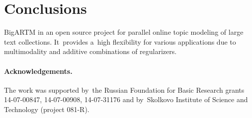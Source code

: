 \documentclass[russian,english]{llncs}
\begin{document}
\section{Conclusions}
\label{sec:Conclusions}

\mbox{BigARTM} in an open source project for parallel online topic modeling of large text collections.
It~provides a~high flexibility for various applications due to
multimodality and additive combinations of regularizers.

\medskip
\paragraph{Acknowledgements.}
    The work was supported by~the Russian Foundation for Basic Research grants 14-07-00847, 14-07-00908, 14-07-31176
    and by~Skolkovo Institute of Science and Technology (project 081-R).


%
%
\end{document}
